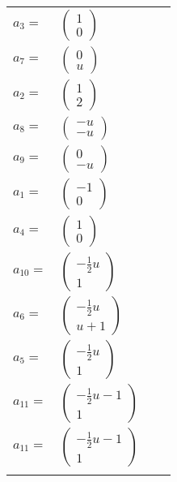 \documentclass[1p]{elsarticle_modified}
\theoremstyle{definition}
\begin{document}
\begin{tabular}{m{7pt} m{180pt} m{7pt} m{180pt} }
\flushright $a_{3}=$&$\begin{pmatrix}1\\0\end{pmatrix}$ \\
\flushright $a_{7}=$&$\begin{pmatrix}0\\u\end{pmatrix}$ \\
\flushright $a_{2}=$&$\begin{pmatrix}1\\2\end{pmatrix}$ \\
\flushright $a_{8}=$&$\begin{pmatrix}- u\\- u\end{pmatrix}$ \\
\flushright $a_{9}=$&$\begin{pmatrix}0\\- u\end{pmatrix}$ \\
\flushright $a_{1}=$&$\begin{pmatrix}-1\\0\end{pmatrix}$ \\
\flushright $a_{4}=$&$\begin{pmatrix}1\\0\end{pmatrix}$ \\
\flushright $a_{10}=$&$\begin{pmatrix}-\frac{1}{2} u\\1\end{pmatrix}$ \\
\flushright $a_{6}=$&$\begin{pmatrix}-\frac{1}{2} u\\u+1\end{pmatrix}$ \\
\flushright $a_{5}=$&$\begin{pmatrix}-\frac{1}{2} u\\1\end{pmatrix}$ \\
\flushright $a_{11}=$&$\begin{pmatrix}-\frac{1}{2} u-1\\1\end{pmatrix}$\\ \flushright $a_{11}=$&$\begin{pmatrix}-\frac{1}{2} u-1\\1\end{pmatrix}$\\&\end{tabular}
\end{document}
